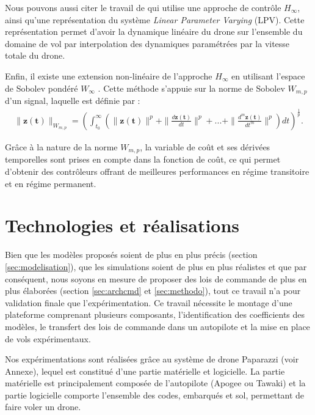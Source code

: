 Nous pouvons aussi citer le travail de \cite{SNYDER2021106621} qui utilise une approche de contrôle $H_{\infty}$, ainsi qu'une représentation du système \textit{Linear Parameter Varying} (LPV). Cette représentation permet d'avoir la dynamique linéaire du drone sur l'ensemble du domaine de vol par interpolation des dynamiques paramétrées par la vitesse totale du drone.

Enfin, il existe une extension non-linéaire de l'approche $H_{\infty}$ en utilisant l'espace de Sobolev pondéré $W_{\infty}$ \cite{cardoso2018nonlinear, CardosoEsteban2019, cardoso2021robust, cardoso2024robust}. Cette méthode s'appuie sur la norme de Sobolev $W_{m,p}$  d'un signal, laquelle est définie par :
\begin{align*}
    \|\boldsymbol{z(t)}\|_{W_{m,p}} = \left( \int_{t_{0}}^{\infty}(\|\boldsymbol{z(t)}\|^{p} + \|\frac{d \boldsymbol{z(t)}}{dt}\|^{p} + ... + \|\frac{d^{m} \boldsymbol{z(t)}}{dt^{m}}\|^{p}) dt \right)^{\frac{1}{p}}.
\end{align*}  

Grâce à la nature de la norme $W_{m,p}$, la variable de coût et ses dérivées temporelles sont prises en compte dans la fonction de coût, ce qui permet d'obtenir des contrôleurs offrant de meilleures performances en régime transitoire et en régime permanent.


\section{Technologies et réalisations}

Bien que les modèles proposés soient de plus en plus précis (section \ref{sec:modelisation}), que les simulations soient de plus en plus réalistes et que par conséquent, nous soyons en mesure de proposer des lois de commande de plus en plus élaborées (section \ref{sec:archcmd} et \ref{sec:methodo}), tout ce travail n'a pour validation finale que l'expérimentation. Ce travail nécessite  le montage d'une plateforme comprenant plusieurs composants, l'identification des coefficients des modèles, le transfert des lois de commande dans un autopilote et la mise en place de vols expérimentaux.


Nos expérimentations sont réalisées grâce au système de drone Paparazzi (voir Annexe), lequel est constitué d'une partie matérielle et logicielle. La partie matérielle est principalement composée de l'autopilote (Apogee ou Tawaki) et la partie logicielle comporte l'ensemble des codes, embarqués et sol, permettant de faire voler un drone. 

